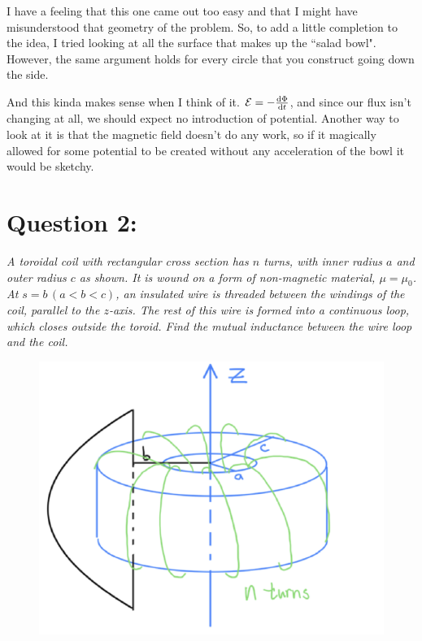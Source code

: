 \documentclass[12pt]{article}
\begin{document}
I have a feeling that this one came out too easy and that I might have misunderstood that geometry of the problem. So, to add a little completion to the idea, I tried looking at all the surface that makes up the ``salad bowl". However, the same argument holds for every circle that you construct going down the side. 

And this kinda makes sense when I think of it. $\mathcal{E} = -\dv{\Phi}{t}$, and since our flux isn't changing at all, we should expect no introduction of potential. Another way to look at it is that the magnetic field doesn't do any work, so if it magically allowed for some potential to be created without any acceleration of the bowl it would be sketchy.  
\newpage


\section*{Question 2:}
\emph{A toroidal coil with rectangular cross section has $n$ turns, with inner radius $a$ and outer radius $c$ as shown. It is wound on a form of non-magnetic material, $\mu = \mu_0$. At $s=b \, (a<b<c)$, an insulated wire is threaded between the windings of the coil, parallel to the $z$-axis. The rest of this wire is formed into a continuous loop, which closes outside the toroid. Find the mutual inductance between the wire loop and the coil.}
\begin{figure}[h]
\centering
\includegraphics[scale=.5]{exam02_question2.png}
\label{fig:2.1}
\end{figure}
\end{document}
